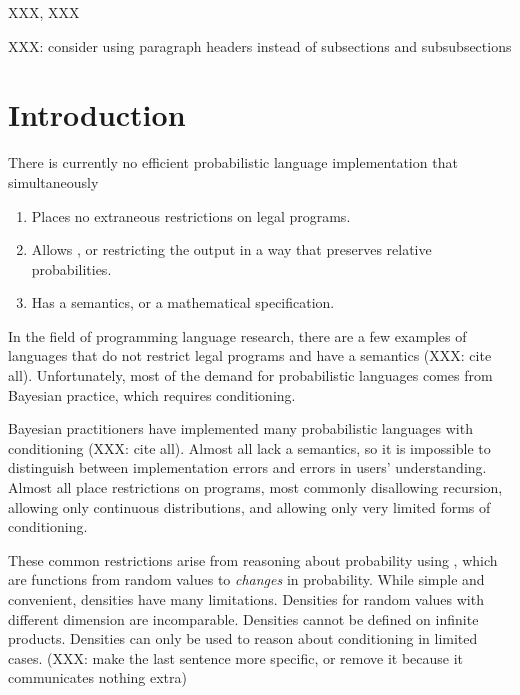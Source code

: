 \documentclass[preprint]{sigplanconf}
\begin{document}
\keywords
XXX, XXX


XXX: consider using paragraph headers instead of subsections and subsubsections

\section{Introduction}

There is currently no efficient probabilistic language implementation that simultaneously
\begin{enumerate}
	\item Places no extraneous restrictions on legal programs.
	\item Allows , or restricting the output in a way that preserves relative probabilities.
	\item Has a semantics, or a mathematical specification.
\end{enumerate}
In the field of programming language research, there are a few examples of languages that do not restrict legal programs and have a semantics (XXX: cite all).
Unfortunately, most of the demand for probabilistic languages comes from Bayesian practice, which requires conditioning.

Bayesian practitioners have implemented many probabilistic languages with conditioning (XXX: cite all).
Almost all lack a semantics, so it is impossible to distinguish between implementation errors and errors in users' understanding.
Almost all place restrictions on programs, most commonly disallowing recursion, allowing only continuous distributions, and allowing only very limited forms of conditioning.

These common restrictions arise from reasoning about probability using , which are functions from random values to \emph{changes} in probability.
While simple and convenient, densities have many limitations.
Densities for random values with different dimension are incomparable.
Densities cannot be defined on infinite products.
Densities can only be used to reason about conditioning in limited cases.
(XXX: make the last sentence more specific, or remove it because it communicates nothing extra)
\end{document}

